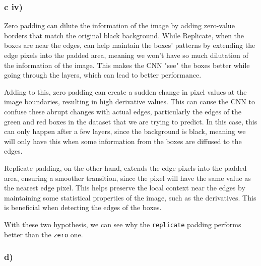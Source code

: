 \documentclass{article}
\begin{document}
\subsubsection*{c iv)}

Zero padding can dilute the information of the image by adding zero-value borders that match the original black background.
While Replicate, when the boxes are near the edges, can help maintain the boxes' patterns by extending the edge pixels into the padded area,
meaning we won't have so much dilutation of the information of the image. This makes the CNN "see" the boxes better while going
through the layers, which can lead to better performance.

Adding to this, zero padding can create a sudden change in pixel values at the image boundaries, resulting in high derivative values.
This can cause the CNN to confuse these abrupt changes with actual edges,
particularly the edges of the green and red boxes in the dataset that we are trying to predict.
In this case, this can only happen after a few layers, since the
background is black, meaning we will only have this when some information from the boxes are diffused to the edges.

Replicate padding, on the other hand, extends the edge pixels into the padded area, ensuring a smoother transition, since
the pixel will have the same value as the nearest edge pixel. This helps preserve the local context near the edges by maintaining
some statistical properties of the image, such as the derivatives. This is beneficial
when detecting the edges of the boxes. 

With these two hypothesis, we can see why the \texttt{replicate} padding performs better than the \texttt{zero} one.



\subsubsection*{d)}
\end{document}
